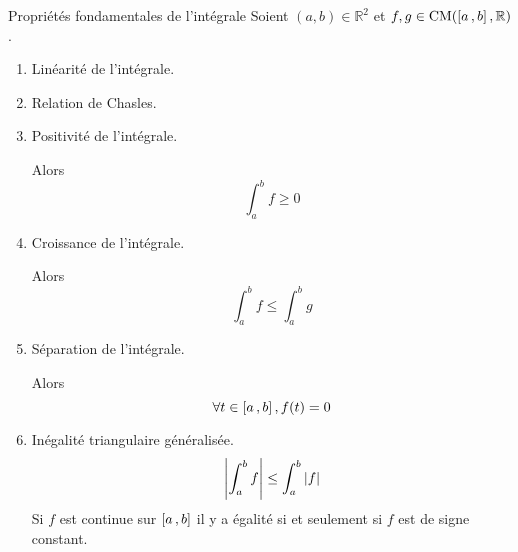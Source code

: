     \begin{prop}{Propriétés fondamentales de l’intégrale}{}
        Soient $(a,b) \in \mathbb{R}^2$ et $f,g \in \operatorname{CM}(\left[ a \, , b \right],\mathbb{R})$. 

        \begin{enumerate}
            \item Linéarité de l’intégrale.
            \item Relation de Chasles.
            \item Positivité de l’intégrale.
            
            Alors 
            \[ \int_{a}^{b}f \geq 0 \]
            \item Croissance de l’intégrale.
            
            Alors \[ \int_{a}^{b}f \leq \int_{a}^{b}g \]
            \item Séparation de l’intégrale.
            
            Alors \[ \forall t \in \left[ a \, , b \right],  f(t)= 0 \] 
            \item Inégalité triangulaire généralisée.
            \[ \left\lvert \int_{a}^{b}f\right\rvert \leq \int_{a}^{b} \left\lvert f\right\rvert \]
            Si $f$ est continue sur $\left[ a \, , b \right]$ il y a égalité si et seulement si $f$ est de signe constant.
        \end{enumerate}
    \end{prop}

